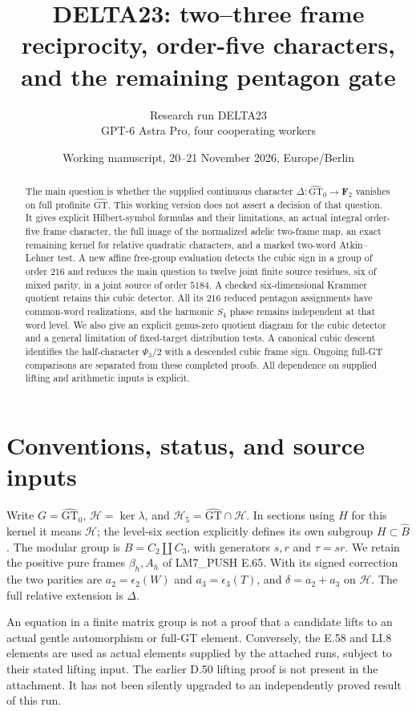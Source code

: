 \documentclass[11pt]{article}
\title{DELTA23: two--three frame reciprocity,\quad
  order-five characters, and the remaining pentagon gate}
\author{Research run DELTA23\\GPT-6 Astra Pro, four cooperating workers}
\date{Working manuscript, 20--21 November 2026, Europe/Berlin}
\newcommand{\GT}{\widehat{\mathrm{GT}}}
\newcommand{\GTz}{\widehat{\mathrm{GT}}_0}
\newcommand{\F}{\mathbf F}
\begin{document}
\maketitle
\begin{abstract}
The main question is whether the supplied continuous character
$\Delta:\GTz\to\F_2$ vanishes on full profinite $\GT$.
This working version does not assert a decision of that question.
It gives explicit Hilbert-symbol formulas and their limitations,
an actual integral order-five frame character, the full image of
the normalized adelic two-frame map, an exact remaining kernel
for relative quadratic characters, and a marked two-word
Atkin--Lehner test.  A new affine free-group evaluation detects
the cubic sign in a group of order $216$ and reduces the main
question to twelve joint finite source residues, six of mixed
parity, in a joint source of order $5184$. A checked six-dimensional
Krammer quotient retains this cubic detector. All its $216$
reduced pentagon assignments have common-word realizations, and
the harmonic $S_4$ phase remains independent at that word level.
We also give an explicit genus-zero quotient diagram for the
cubic detector and a general limitation of fixed-target
distribution tests. A canonical cubic descent identifies the
half-character $\Psi_3/2$ with a descended cubic frame sign.
Ongoing full-GT comparisons are separated
from these completed proofs. All dependence on supplied
lifting and arithmetic inputs is explicit.
\end{abstract}
\tableofcontents

\section{Conventions, status, and source inputs}
Write $G=\GTz$, $\mathcal H=\ker\lambda$, and
$\mathcal H_5=\GT\cap\mathcal H$.  In sections using $H$
for this kernel it means $\mathcal H$; the level-six section
explicitly defines its own subgroup $H\subset\widehat B$.
The modular group is $B=C_2\amalg C_3$, with generators
$s,r$ and $\tau=sr$.  We retain the positive pure frames
$\beta_h,A_h$ of LM7\_PUSH E.65.  With its signed correction
the two parities are $a_2=\epsilon_2(W)$ and
$a_3=\epsilon_3(T)$, and $\delta=a_2+a_3$ on $\mathcal H$.
The full relative extension is $\Delta$.

An equation in a finite matrix group is not a proof that a
candidate lifts to an actual gentle automorphism or full-GT
element.  Conversely, the E.58 and LI.8 elements are used as
actual elements supplied by the attached runs, subject to their
stated lifting input.  The earlier D.50 lifting proof is not
present in the attachment.  It has not been silently upgraded
to an independently proved result of this run.
\end{document}
